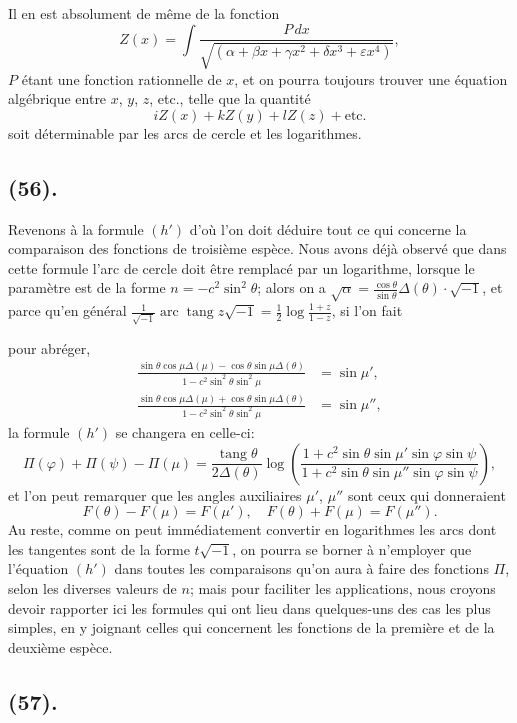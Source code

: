 \documentclass{article}
\begin{document}
Il en est absolument de même de la fonction
\[ Z(x)=\int\frac{P\,dx}{\sqrt{(\alpha+\beta x+\gamma x^{2}+\delta x^{3}+\varepsilon x^{4})}}, \]
$P$ étant une fonction rationnelle de $x$, et on pourra toujours trouver une équation algébrique entre $x$, $y$, $z$, etc., telle que la quantité
\[ iZ(x)+kZ(y)+lZ(z)+\text{etc.} \]
soit déterminable par les arcs de cercle et les logarithmes.

\subsection*{(56).}

Revenons à la formule $(h')$ d'où l'on doit déduire tout ce qui concerne la comparaison des fonctions de troisième espèce. Nous avons déjà observé que dans cette formule l'arc de cercle doit être remplacé par un logarithme, lorsque le paramètre est de la forme $n=-c^{2}\sin^{2}\theta$; alors on a $\sqrt{\alpha}=\frac{\cos\theta}{\sin\theta}\Delta(\theta)\cdot\sqrt{-1}$, et parce qu'en général $\frac{1}{\sqrt{-1}}\operatorname{arc}\operatorname{tang}z\sqrt{-1}=\frac{1}{2}\log\frac{1+z}{1-z}$, si l'on fait

pour abréger,
\[ \begin{aligned} \frac{\sin\theta\cos\mu\Delta(\mu)-\cos\theta\sin\mu\Delta(\theta)}{1-c^{2}\sin^{2}\theta\sin^{2}\mu}&=\sin\mu',\\ \frac{\sin\theta\cos\mu\Delta(\mu)+\cos\theta\sin\mu\Delta(\theta)}{1-c^{2}\sin^{2}\theta\sin^{2}\mu}&=\sin\mu'', \end{aligned} \]
la formule $(h')$ se changera en celle-ci:
\[ \Pi(\varphi)+\Pi(\psi)-\Pi(\mu)=\frac{\operatorname{tang}\theta}{2\Delta(\theta)}\log\left(\frac{1+c^{2}\sin\theta\sin\mu'\sin\varphi\sin\psi}{1+c^{2}\sin\theta\sin\mu''\sin\varphi\sin\psi}\right), \]
et l'on peut remarquer que les angles auxiliaires $\mu'$, $\mu''$ sont ceux qui donneraient
\[ F(\theta)-F(\mu)=F(\mu'),\quad F(\theta)+F(\mu)=F(\mu''). \]
Au reste, comme on peut immédiatement convertir en logarithmes les arcs dont les tangentes sont de la forme $t\sqrt{-1}$, on pourra se borner à n'employer que l'équation $(h')$ dans toutes les comparaisons qu'on aura à faire des fonctions $\Pi$, selon les diverses valeurs de $n$; mais pour faciliter les applications, nous croyons devoir rapporter ici les formules qui ont lieu dans quelques-uns des cas les plus simples, en y joignant celles qui concernent les fonctions de la première et de la deuxième espèce.

\subsection*{(57).}
\end{document}

